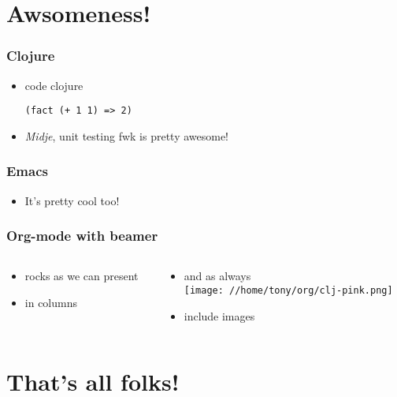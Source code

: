 \documentclass[bigger]{beamer}
\begin{document}
\section{Awsomeness!}
\label{sec-2}
\begin{frame}[fragile]
\frametitle{Clojure}
\label{sec-2-1}
\begin{itemize}

\item code clojure\\
\label{sec-2-1-1}%
\begin{verbatim}
(fact (+ 1 1) => 2)
\end{verbatim}

\item \emph{Midje}, unit testing fwk is pretty awesome!
\label{sec-2-1-2}%
\end{itemize} %
\end{frame}
\begin{frame}
\frametitle{Emacs}
\label{sec-2-2}
\begin{itemize}

\item It's pretty cool too!
\label{sec-2-2-1}%
\end{itemize} %
\end{frame}
\begin{frame}
\frametitle{Org-mode with beamer}
\label{sec-2-3}
\begin{columns}
\begin{column}{0.5\textwidth}
\begin{itemize}

\item rocks as we can present
\label{sec-2-3-1}%

\item in columns
\label{sec-2-3-2}%
\end{itemize} %
\end{column}
\begin{column}{0.5\textwidth}
\begin{itemize}

\item and as always\\
\label{sec-2-3-3}%
\texttt{[image: //home/tony/org/clj-pink.png]}

\item include images
\label{sec-2-3-4}%
\end{itemize} %
\end{column}
\end{columns}
\end{frame}
\section{That's all folks!}
\label{sec-3}
\end{document}
